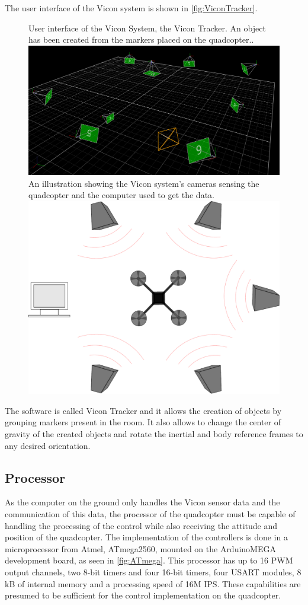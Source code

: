 The user interface of the Vicon system is shown in \autoref{fig:ViconTracker}. 
%
\begin{figure}[H]
	\centering
	\captionbox
	{
		User interface of the Vicon System, the Vicon Tracker. An object has been created from the markers placed on the quadcopter..
		\label{fig:ViconTracker}
	}
	{
	\includegraphics[width=.5\textwidth]{figures/ViconTracker3}
	}
  \hspace{5pt}
  \captionbox
  {
  	An illustration showing the Vicon system's cameras sensing the quadcopter and the computer used to get the data.
  	\label{fig:Vicontotalsystem}
  }
  {
  	\includegraphics[width=.40\textwidth]{figures/system.pdf}
  }
\end{figure}
The software is called Vicon Tracker and it allows the creation of objects by grouping markers present in the room. It also allows to change the center of gravity of the created objects and rotate the inertial and body reference frames to any desired orientation.

\subsection{Processor}
As the computer on the ground only handles the Vicon sensor data and the communication of this data, the processor of the quadcopter must be capable of handling the processing of the control while also receiving the attitude and position of the quadcopter.
The implementation of the controllers is done in a microprocessor from Atmel, ATmega2560, mounted on the ArduinoMEGA development board, as seen in \autoref{fig:ATmega}. This processor has up to 16 PWM output channels, two 8-bit timers and four 16-bit timers, four USART modules, 8 kB of internal memory and a processing speed of 16M IPS. These capabilities are presumed to be sufficient for the control implementation on the quadcopter.\cite{ATmega2560}

